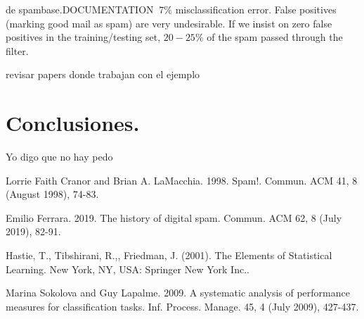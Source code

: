 \documentclass[12pt, letterpaper]{article}
\begin{document}
de spambase.DOCUMENTATION
$~7\%$ misclassification error.
False positives (marking good mail as spam) are very undesirable.
If we insist on zero false positives in the training/testing set,
$20-25\%$ of the spam passed through the filter.

revisar papers donde trabajan con el ejemplo

\section{Conclusiones.}
Yo digo que no hay pedo

\begin{thebibliography}{1}

Lorrie Faith Cranor and Brian A. LaMacchia. 1998. Spam!. Commun. ACM 41, 8 (August 1998), 74-83. 

Emilio Ferrara. 2019. The history of digital spam. Commun. ACM 62, 8 (July 2019), 82-91. 

Hastie, T., Tibshirani, R.,, Friedman, J. (2001). The Elements of Statistical Learning. New York, NY, USA: Springer New York Inc.. 

Marina Sokolova and Guy Lapalme. 2009. A systematic analysis of performance measures for classification tasks. Inf. Process. Manage. 45, 4 (July 2009), 427-437. 

\end{thebibliography}
\end{document}
